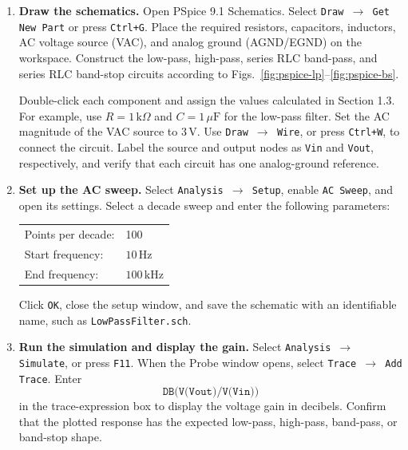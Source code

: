 \documentclass[12pt,a4paper]{article}
\begin{document}
\begin{enumerate}[leftmargin=0.8cm,label=\textbf{Step \arabic*:},itemsep=0.55em]
  \item \textbf{Draw the schematics.}
  Open PSpice 9.1 Schematics. Select \texttt{Draw $\rightarrow$ Get New Part} or press \texttt{Ctrl+G}. Place the required resistors, capacitors, inductors, AC voltage source (VAC), and analog ground (AGND/EGND) on the workspace. Construct the low-pass, high-pass, series RLC band-pass, and series RLC band-stop circuits according to Figs.~\ref{fig:pspice-lp}--\ref{fig:pspice-bs}.

  Double-click each component and assign the values calculated in Section 1.3. For example, use $R=1\,\mathrm{k}\Omega$ and $C=1\,\mu\mathrm{F}$ for the low-pass filter. Set the AC magnitude of the VAC source to $3\,\mathrm{V}$. Use \texttt{Draw $\rightarrow$ Wire}, or press \texttt{Ctrl+W}, to connect the circuit. Label the source and output nodes as \texttt{Vin} and \texttt{Vout}, respectively, and verify that each circuit has one analog-ground reference.

  \item \textbf{Set up the AC sweep.}
  Select \texttt{Analysis $\rightarrow$ Setup}, enable \texttt{AC Sweep}, and open its settings. Select a decade sweep and enter the following parameters:
  \begin{center}
    \begin{tabular}{@{}ll@{}}
      Points per decade: & 100 \\
      Start frequency: & $10\,\mathrm{Hz}$ \\
      End frequency: & $100\,\mathrm{kHz}$
    \end{tabular}
  \end{center}
  Click \texttt{OK}, close the setup window, and save the schematic with an identifiable name, such as \texttt{LowPassFilter.sch}.

  \item \textbf{Run the simulation and display the gain.}
  Select \texttt{Analysis $\rightarrow$ Simulate}, or press \texttt{F11}. When the Probe window opens, select \texttt{Trace $\rightarrow$ Add Trace}. Enter
  \begin{equation}
    \texttt{DB(V(Vout)/V(Vin))}
    \label{eq:pspice-db-trace}
  \end{equation}
  in the trace-expression box to display the voltage gain in decibels. Confirm that the plotted response has the expected low-pass, high-pass, band-pass, or band-stop shape.


\end{enumerate}
\end{document}
